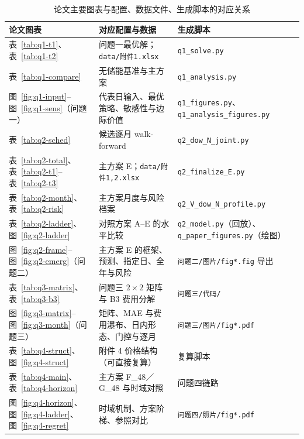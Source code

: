\begin{table}[H]
  \centering
  \caption{论文主要图表与配置、数据文件、生成脚本的对应关系}
  \label{tab:app-map}
  \footnotesize
  \setlength{\tabcolsep}{4pt}
  \begin{tabularx}{\textwidth}{l>{\raggedright\arraybackslash}Xl}
    \toprule
    论文图表 & 对应配置与数据 & 生成脚本 \\
    \midrule
    表~\ref{tab:q1-t1}、表~\ref{tab:q1-t2} & 问题一最优解；\texttt{data/附件1.xlsx} & \texttt{q1\_solve.py} \\
    表~\ref{tab:q1-compare} & 无储能基准与主方案 & \texttt{q1\_analysis.py} \\
    图~\ref{fig:q1-input}--图~\ref{fig:q1-sens}（问题一） & 代表日输入、最优策略、敏感性与边际价值 & \texttt{q1\_figures.py}、\texttt{q1\_analysis\_figures.py} \\
    表~\ref{tab:q2-sched} & 36 候选逐月 walk-forward & \texttt{q2\_dow\_N\_joint.py} \\
    表~\ref{tab:q2-total}、表~\ref{tab:q2-t1}--表~\ref{tab:q2-t3} & 主方案 E；\texttt{data/附件1,2.xlsx} & \texttt{q2\_finalize\_E.py} \\
    表~\ref{tab:q2-month}、表~\ref{tab:q2-risk} & 主方案月度与风险档案 & \texttt{q2\_V\_dow\_N\_profile.py} \\
    表~\ref{tab:q2-ladder}、图~\ref{fig:q2-ladder} & 对照方案 A--E 的水平比较 & \texttt{q2\_model.py}（回放）、\texttt{q\_paper\_figures.py}（绘图） \\
    图~\ref{fig:q2-frame}--图~\ref{fig:q2-emerg}（问题二） & 主方案 E 的框架、预测、指定日、全年与风险 & \texttt{问题二/图片/fig*.fig} 导出 \\
    表~\ref{tab:q3-matrix}、表~\ref{tab:q3-b3} & 问题三 $2\times2$ 矩阵与 B3 费用分解 & \texttt{问题三/代码/} \\
    图~\ref{fig:q3-matrix}--图~\ref{fig:q3-month}（问题三） & 矩阵、MAE 与费用瀑布、日内形态、门控与逐月 & \texttt{问题三/图片/fig*.pdf} \\
    表~\ref{tab:q4-struct}、图~\ref{fig:q4-struct} & 附件 4 价格结构（可直接复算） & 复算脚本 \\
    表~\ref{tab:q4-main}、表~\ref{tab:q4-horizon} & 主方案 F\_48／G\_48 与时域对照 & 问题四链路 \\
    图~\ref{fig:q4-horizon}、图~\ref{fig:q4-ladder}、图~\ref{fig:q4-regret} & 时域机制、方案阶梯、参照对比 & \texttt{问题四/照片/fig*.pdf} \\
    \bottomrule
  \end{tabularx}
\end{table}

